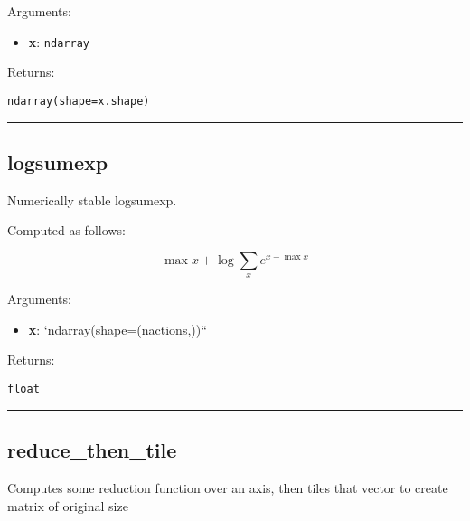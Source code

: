 Arguments:

\begin{itemize}
\tightlist
\item
  \textbf{x}: \texttt{ndarray}
\end{itemize}

Returns:

\texttt{ndarray(shape=x.shape)}

\begin{center}\rule{0.5\linewidth}{\linethickness}\end{center}

\subsection{logsumexp}\label{logsumexp}

\begin{Shaded}
\begin{Highlighting}[]
\end{Highlighting}
\end{Shaded}

Numerically stable logsumexp.

Computed as follows:

\[
\max x + \log \sum_x e^{x - \max x}
\]

Arguments:

\begin{itemize}
\tightlist
\item
  \textbf{x}: `ndarray(shape=(nactions,))``
\end{itemize}

Returns:

\texttt{float}

\begin{center}\rule{0.5\linewidth}{\linethickness}\end{center}

\subsection{reduce\_then\_tile}\label{reduce_then_tile}

\begin{Shaded}
\begin{Highlighting}[]
\OperatorTok{=}\NormalTok{)}
\end{Highlighting}
\end{Shaded}

Computes some reduction function over an axis, then tiles that vector to
create matrix of original size

